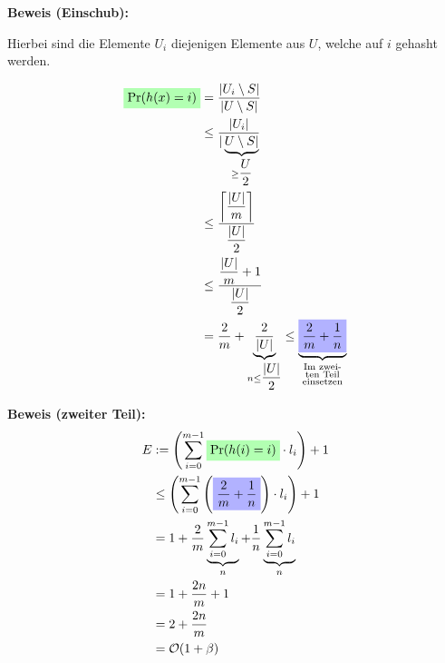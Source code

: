 \documentclass{scrartcl}%
\begin{document}
    \newpage
    \textbf{\textsf{Beweis (Einschub):}}
		
		Hierbei sind die Elemente $U_i$ diejenigen Elemente aus $U$, welche auf $i$ gehasht werden.
		
    \begin{equation*}
        \begin{flalign}
            \colorbox{green!30}{$\text{Pr}(h(x)=i)$} &= \dfrac{|U_i\setminus S|}{|U\setminus S|}\\\nonumber
            & \leq \dfrac{|U_i|}{|\underbrace{U\setminus S|}_{\geq \dfrac{U}{2}}}\\\nonumber
            &\leq \dfrac{\left\lceil\dfrac{|U|}{m}\right\rceil}{\dfrac{|U|}{2}}\\\nonumber
            &\leq \dfrac{\dfrac{|U|}{m} + 1}{\dfrac{|U|}{2}}\\\nonumber
            &= \dfrac{2}{m} + \underbrace{\dfrac{2}{|U|}}_{n \leq \dfrac{|U|}{2}} \leq \underbrace{\colorbox{blue!30}{$\dfrac{2}{m} + \dfrac{1}{n}$}}_{\substack{\text{Im zwei-} \\ \text{ten Teil} \\ \text{einsetzen}}}
        \end{flalign}
    \end{equation*}

    \vspace*{0.3cm}
    \textbf{\textsf{Beweis (zweiter Teil):}}
    \begin{equation*}
        \begin{flalign}
            E & :=\left(\sum_{i=0}^{m-1}\colorbox{green!30}{$\text{Pr}(h(i)=i)$} \cdot l_i\right) + 1 \\\nonumber
            & \leq \left(\sum_{i=0}^{m-1}\left(\colorbox{blue!30}{$\dfrac{2}{m} + \dfrac{1}{n}$}\right) \cdot l_i\right) + 1 \\\nonumber
            & =  1 + \frac{2}{m} \underbrace{\sum_{i=0}^{m-1}l_i}_{n} + \frac{1}{n} \underbrace{\sum_{i=0}^{m-1}l_i}_{n} \\\nonumber
            & =  1 + \frac{2n}{m} +1 \\\nonumber
            & = 2 + \frac{2n}{m} \\\nonumber
            & = \mathcal{O}(1+\beta)
        \end{flalign}
    \end{equation*}
    \proofend
\end{document}
